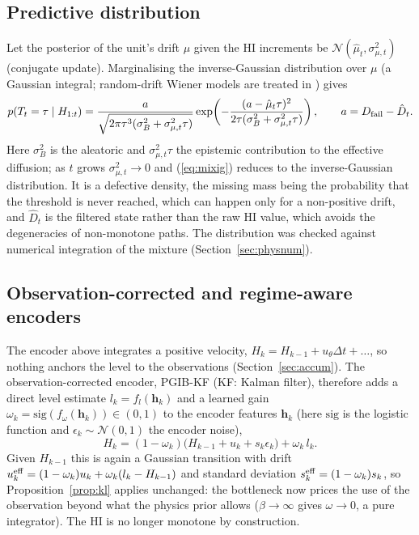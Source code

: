 \documentclass[preprint,12pt]{elsarticle}
\theoremstyle{definition}
\begin{document}
\subsection{Predictive distribution}
Let the posterior of the unit's drift $\mu$ given the HI increments be $\mathcal N(\hat\mu_t,\sigma_{\mu,t}^2)$ (conjugate update). Marginalising the inverse-Gaussian distribution over $\mu$ (a Gaussian integral; random-drift Wiener models are treated in \cite{gebraeel2005,wang2010}) gives
\begin{equation}
p(T_t=\tau\mid H_{1:t})=\frac{a}{\sqrt{2\pi\tau^3(\sigma_B^2+\sigma_{\mu,t}^2\tau)}}\exp\!\left(-\frac{(a-\hat\mu_t\tau)^2}{2\tau(\sigma_B^2+\sigma_{\mu,t}^2\tau)}\right),\qquad a=D_{\rm fail}-\hat D_t .
\label{eq:mixig}
\end{equation}
Here $\sigma_B^2$ is the aleatoric and $\sigma_{\mu,t}^2\tau$ the epistemic contribution to the effective diffusion; as $t$ grows $\sigma_{\mu,t}^2\to0$ and (\ref{eq:mixig}) reduces to the inverse-Gaussian distribution. It is a defective density, the missing mass being the probability that the threshold is never reached, which can happen only for a non-positive drift, and $\hat D_t$ is the filtered state rather than the raw HI value, which avoids the degeneracies of non-monotone paths. The distribution was checked against numerical integration of the mixture (Section~\ref{sec:physnum}).

\subsection{Observation-corrected and regime-aware encoders}
\label{sec:kf}
The encoder above integrates a positive velocity, $H_k=H_{k-1}+u_\theta\Delta t+\dots$, so nothing anchors the level to the observations (Section~\ref{sec:accum}). The observation-corrected encoder, PGIB-KF (KF: Kalman filter), therefore adds a direct level estimate $l_k=f_l(\mathbf h_k)$ and a learned gain $\omega_k=\mathrm{sig}(f_\omega(\mathbf h_k))\in(0,1)$ to the encoder features $\mathbf h_k$ (here $\mathrm{sig}$ is the logistic function and $\epsilon_k\sim\mathcal N(0,1)$ the encoder noise),
\begin{equation}
H_k=(1-\omega_k)\big(H_{k-1}+u_k+s_k\epsilon_k\big)+\omega_k\,l_k .
\end{equation}
Given $H_{k-1}$ this is again a Gaussian transition with drift $u^{\rm eff}_k=(1-\omega_k)u_k+\omega_k(l_k-H_{k-1})$ and standard deviation $s^{\rm eff}_k=(1-\omega_k)s_k$, so Proposition~\ref{prop:kl} applies unchanged: the bottleneck now prices the use of the observation beyond what the physics prior allows ($\beta\to\infty$ gives $\omega\to0$, a pure integrator). The HI is no longer monotone by construction.
\end{document}
